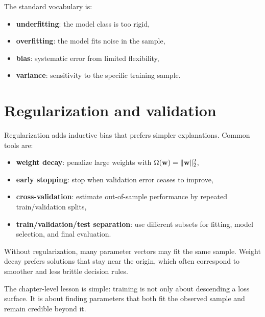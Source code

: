 The standard vocabulary is:
\begin{itemize}
  \item \textbf{underfitting}: the model class is too rigid,
  \item \textbf{overfitting}: the model fits noise in the sample,
  \item \textbf{bias}: systematic error from limited flexibility,
  \item \textbf{variance}: sensitivity to the specific training sample.
\end{itemize}

\section{Regularization and validation}

Regularization adds inductive bias that prefers simpler explanations. Common tools are:
\begin{itemize}
  \item \textbf{weight decay}: penalize large weights with $\Omega(\mathbf{w})=\lVert \mathbf{w} \rVert_2^2$,
  \item \textbf{early stopping}: stop when validation error ceases to improve,
  \item \textbf{cross-validation}: estimate out-of-sample performance by repeated train/validation splits,
  \item \textbf{train/validation/test separation}: use different subsets for fitting, model selection, and final evaluation.
\end{itemize}

\begin{aside}
Without regularization, many parameter vectors may fit the same sample. Weight decay prefers solutions that stay near the origin, which often correspond to smoother and less brittle decision rules.
\end{aside}

The chapter-level lesson is simple: training is not only about descending a loss surface. It is about finding parameters that both fit the observed sample and remain credible beyond it.
